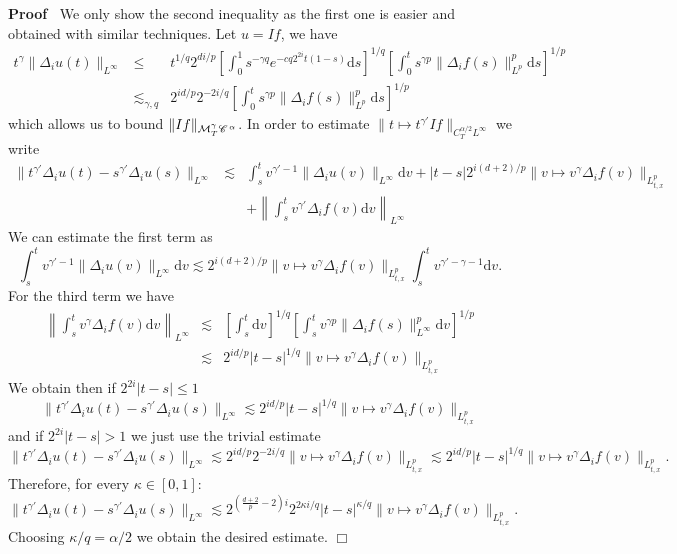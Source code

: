 \documentclass[a4paper,11pt]{article}
\newcommand{\mathd}{\mathrm{d}}
\newenvironment{proof}{\noindent\textbf{Proof\ }}{\hspace*{\fill}$\Box$\medskip}
\newcommand{\CC}{\mathscr{C} \hspace{.1em}}
\begin{document}
\begin{proof}
  We only show the second inequality as the first one is easier and obtained
  with similar techniques. Let $u = I f$, we have
  \begin{eqnarray*}
    t^{\gamma} \| \Delta_i u (t)\|_{L^{\infty}} & \leqslant & t^{1 / q} 2^{di
    / p} \left[ \int_0^1 s^{- \gamma q} e^{- cq 2^{2 i} t (1 - s)} \mathd s
    \right]^{1 / q} \left[ \int_0^t s^{\gamma p} \| \Delta_i f (s)\|_{L^p}^p
    \mathd s \right]^{1 / p}\\
    & \lesssim_{\gamma, q} & 2^{id / p} 2^{- 2 i / q}  \left[ \int_0^t
    s^{\gamma p} \| \Delta_i f (s)\|_{L^p}^p \mathd s \right]^{1 / p}
  \end{eqnarray*}
  which allows us to bound $\| I f \|_{\mathcal{M}^{\gamma}_T \CC^{\alpha}}$.
  In order to estimate $\| t \mapsto t^{\gamma'} I f \|_{C^{\alpha / 2}_T
  L^{\infty}}$ we write
  \begin{eqnarray*}
    \|t^{\gamma'} \Delta_i u (t) - s^{\gamma'} \Delta_i u (s)\|_{L^{\infty}} &
    \lesssim & \int_s^t v^{\gamma' - 1} \| \Delta_i u (v) \|_{L^{\infty}}
    \mathd v + | t - s | 2^{i (d + 2) / p} \| v \mapsto v^{\gamma} \Delta_i f
    (v) \|_{L^p_{t, x}}\\
    &  & + \left\| \int_s^t v^{\gamma'} \Delta_i f (v) \mathd v
    \right\|_{L^{\infty}}
  \end{eqnarray*}
  We can estimate the first term as
  \[ \int_s^t v^{\gamma' - 1} \| \Delta_i u (v) \|_{L^{\infty}} \mathd v
     \lesssim 2^{i (d + 2) / p} \| v \mapsto v^{\gamma} \Delta_i f (v)
     \|_{L^p_{t, x}} \int_s^t v^{\gamma' - \gamma - 1} \mathd v. \]
  For the third term we have
  \begin{eqnarray*}
    \left\| \int_s^t v^{\gamma} \Delta_i f (v) \mathd v \right\|_{L^{\infty}}
    & \lesssim & \left[ \int_s^t \mathd v \right]^{1 / q} \left[ \int_s^t
    v^{\gamma p} \| \Delta_i f (s)\|_{L^{\infty}}^p \mathd v \right]^{1 / p}\\
    & \lesssim & 2^{id / p}  |t - s|^{1 / q}  \| v \mapsto v^{\gamma}
    \Delta_i f (v) \|_{L^p_{t, x}}
  \end{eqnarray*}
  We obtain then if $2^{2 i} | t - s | \leqslant 1$
  \[ \|t^{\gamma'} \Delta_i u (t) - s^{\gamma'} \Delta_i u (s)\|_{L^{\infty}}
     \lesssim 2^{id / p} | t - s |^{1 / q} \| v \mapsto v^{\gamma} \Delta_i f
     (v) \|_{L^p_{t, x}} \]
  and if $2^{2 i} | t - s | > 1$ we just use the trivial estimate
  \[ \|t^{\gamma'} \Delta_i u (t) - s^{\gamma'} \Delta_i u (s)\|_{L^{\infty}}
     \lesssim 2^{id / p} 2^{- 2 i / q}  \| v \mapsto v^{\gamma} \Delta_i f (v)
     \|_{L^p_{t, x}} \lesssim 2^{id / p} | t - s |^{1 / q} \| v \mapsto
     v^{\gamma} \Delta_i f (v) \|_{L^p_{t, x}} . \]
  Therefore, for every $\kappa \in [0, 1]$:
  \[ \|t^{\gamma \prime} \Delta_i u (t) - s^{\gamma \prime} \Delta_i u
     (s)\|_{L^{\infty}} \lesssim 2^{(\frac{d + 2}{p} - 2) i} 2^{2 \kappa i /
     q}  |t - s|^{\kappa / q}  \| v \mapsto v^{\gamma} \Delta_i f (v)
     \|_{L^p_{t, x}} . \]
  Choosing $\kappa / q = \alpha / 2$ we obtain the desired estimate.
\end{proof}
\end{document}
